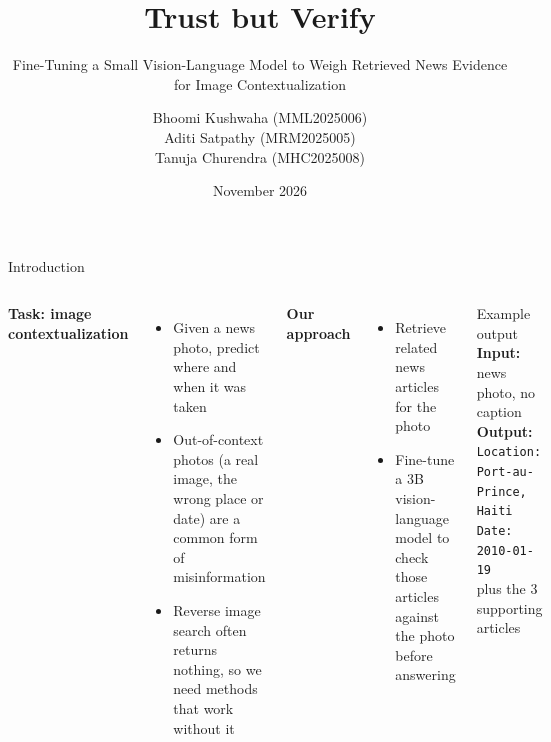 \documentclass[aspectratio=169,10pt]{beamer}
\title{Trust but Verify}
\subtitle{Fine-Tuning a Small Vision-Language Model to Weigh Retrieved News Evidence for Image Contextualization}
\author{Bhoomi Kushwaha (MML2025006)\\Aditi Satpathy (MRM2025005)\\Tanuja Churendra (MHC2025008)}
\institute{Department of Information Technology, IIIT Allahabad, Prayagraj}
\date{November 2026}
\begin{document}
\maketitle

\begin{frame}{Introduction}
\begin{columns}[T]
\textbf{Task: image contextualization}
\begin{itemize}
\item Given a news photo, predict \alert{where} and \alert{when} it was taken
\item Out-of-context photos (a real image, the wrong place or date) are a common form of misinformation
\item Reverse image search often returns nothing, so we need methods that work without it
\end{itemize}
\vspace{0.6em}
\textbf{Our approach}
\begin{itemize}
\item Retrieve related news articles for the photo
\item Fine-tune a 3B vision-language model to \alert{check} those articles against the photo before answering
\end{itemize}
\begin{block}{Example output}
\small
\textbf{Input:} news photo, no caption\\[0.3em]
\textbf{Output:}\\
\texttt{Location: Port-au-Prince, Haiti}\\
\texttt{Date: 2010-01-19}\\[0.3em]
plus the 3 supporting articles
\end{block}
\end{columns}
\end{frame}
\end{document}

